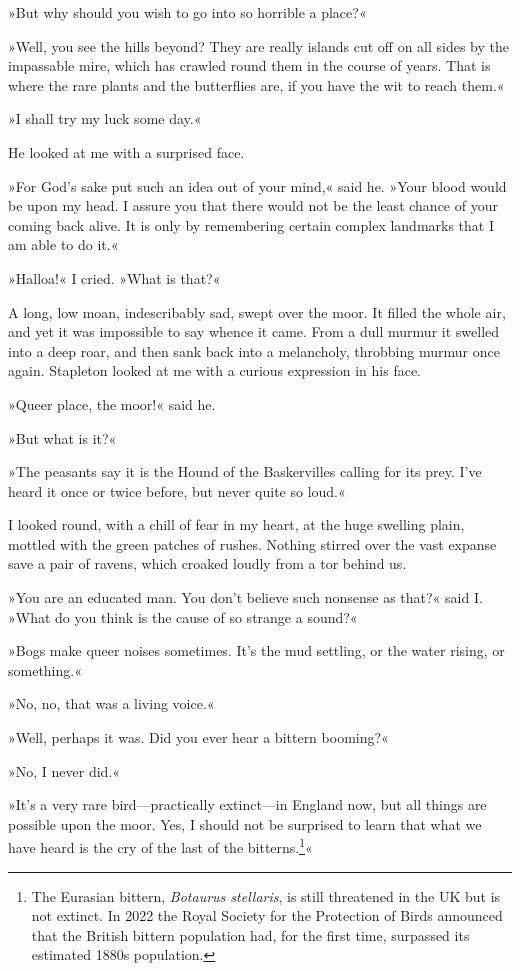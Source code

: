 \afterpage{\clearpage}

»But why should you wish to go into so horrible a place?«

»Well, you see the hills beyond? They are really islands cut off on all sides by the impassable mire, which has crawled round them in the course of years. That is where the rare plants and the butterflies are, if you have the wit to reach them.«

»I shall try my luck some day.«

He looked at me with a surprised face.

»For God's sake put such an idea out of your mind,« said he. »Your blood would be upon my head. I assure you that there would not be the least chance of your coming back alive. It is only by remembering certain complex landmarks that I am able to do it.«

»Halloa!« I cried. »What is that?«

A long, low moan, indescribably sad, swept over the moor. It filled the whole air, and yet it was impossible to say whence it came. From a dull murmur it swelled into a deep roar, and then sank back into a melancholy, throbbing murmur once again. Stapleton looked at me with a curious expression in his face.

»Queer place, the moor!« said he.

»But what is it?«

»The peasants say it is the Hound of the Baskervilles calling for its prey. I've heard it once or twice before, but never quite so loud.«

I looked round, with a chill of fear in my heart, at the huge swelling plain, mottled with the green patches of rushes. Nothing stirred over the vast expanse save a pair of ravens, which croaked loudly from a tor behind us.

»You are an educated man. You don't believe such nonsense as that?« said I. »What do you think is the cause of so strange a sound?«

»Bogs make queer noises sometimes. It's the mud settling, or the water rising, or something.«

»No, no, that was a living voice.«

»Well, perhaps it was. Did you ever hear a bittern booming?«

»No, I never did.«

»It's a very rare bird\allowbreak---\allowbreak practically extinct\allowbreak---\allowbreak in England now, but all things are possible upon the moor. Yes, I should not be surprised to learn that what we have heard is the cry of the last of the bitterns.\footnote{The Eurasian bittern, \textit{Botaurus stellaris}, is still threatened in the UK but is not extinct. In 2022 the Royal Society for the Protection of Birds announced that the British bittern population had, for the first time, surpassed its estimated 1880s population.}«

